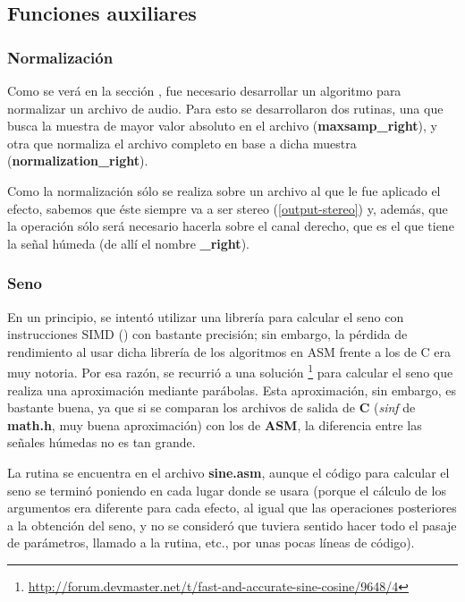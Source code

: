 \subsection{Funciones auxiliares}
\label{subsec:desarrollo-auxiliares}

\subsubsection{Normalización}
\label{subsec:desarrollo-normalizacion}
Como se verá en la sección , fue necesario desarrollar un algoritmo para normalizar un archivo de audio. Para esto se desarrollaron dos rutinas, una que busca la muestra de mayor valor absoluto en el archivo (\textbf{maxsamp\_right}), y otra que normaliza el  archivo completo en base a dicha muestra (\textbf{normalization\_right}).

Como la normalización sólo se realiza sobre un archivo al que le fue aplicado el efecto, sabemos que éste siempre va a ser stereo (\ref{output-stereo}) y, además, que la operación sólo será necesario hacerla sobre el canal derecho, que es el que tiene la señal húmeda (de allí el nombre \textbf{\_right}).

\subsubsection{Seno}
\label{subsec:desarrollo-seno}
En un principio, se intentó utilizar una librería para calcular el seno con instrucciones SIMD () con bastante precisión; sin embargo, la pérdida de rendimiento al usar dicha librería de los algoritmos en ASM frente a los de C era muy notoria. Por esa razón, se recurrió a una solución \footnote{\url{http://forum.devmaster.net/t/fast-and-accurate-sine-cosine/9648/4}} para calcular el seno que realiza una aproximación mediante parábolas. Esta aproximación, sin embargo, es bastante buena, ya que si se comparan los archivos de salida de \textbf{C} (\textit{sinf} de \textbf{math.h}, muy buena aproximación) con los de \textbf{ASM}, la diferencia entre las señales húmedas no es tan grande.

La rutina se encuentra en el archivo \textbf{sine.asm}, aunque el código para calcular el seno se terminó poniendo en cada lugar donde se usara (porque el cálculo de los argumentos era diferente para cada efecto, al igual que las operaciones posteriores a la obtención del seno, y no se consideró que tuviera sentido hacer todo el pasaje de parámetros, llamado a la rutina, etc., por unas pocas líneas de código).